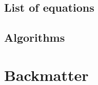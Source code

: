 \section{List of equations}\label{sec:list-of-equations}


\newpage
\section{Algorithms}\label{sec:algorithms}



\newpage





\backmatter
{}
\chapter{Backmatter}\label{ch:backmatter}
\printglossary[type=defi, title=Definitionen]


\printindex

\printbibliography



